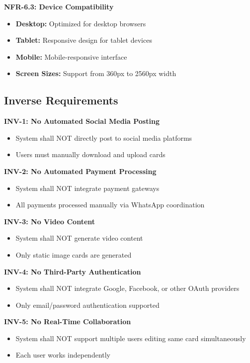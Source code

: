 \documentclass[12pt,a4paper]{article}
\begin{document}
\textbf{NFR-6.3: Device Compatibility}
\begin{itemize}
    \item \textbf{Desktop:} Optimized for desktop browsers
    \item \textbf{Tablet:} Responsive design for tablet devices
    \item \textbf{Mobile:} Mobile-responsive interface
    \item \textbf{Screen Sizes:} Support from 360px to 2560px width
\end{itemize}

\subsection{Inverse Requirements}

\textbf{INV-1: No Automated Social Media Posting}
\begin{itemize}
    \item System shall NOT directly post to social media platforms
    \item Users must manually download and upload cards
\end{itemize}

\textbf{INV-2: No Automated Payment Processing}
\begin{itemize}
    \item System shall NOT integrate payment gateways
    \item All payments processed manually via WhatsApp coordination
\end{itemize}

\textbf{INV-3: No Video Content}
\begin{itemize}
    \item System shall NOT generate video content
    \item Only static image cards are generated
\end{itemize}

\textbf{INV-4: No Third-Party Authentication}
\begin{itemize}
    \item System shall NOT integrate Google, Facebook, or other OAuth providers
    \item Only email/password authentication supported
\end{itemize}

\textbf{INV-5: No Real-Time Collaboration}
\begin{itemize}
    \item System shall NOT support multiple users editing same card simultaneously
    \item Each user works independently
\end{itemize}
\end{document}
